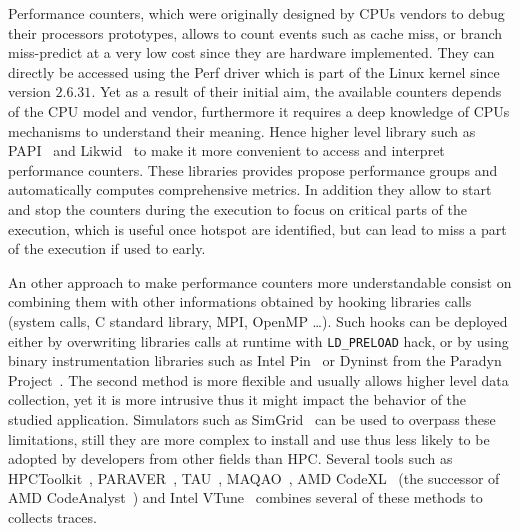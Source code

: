 Performance counters, which were originally designed by \glspl{CPU} vendors to
debug their processors prototypes, allows to count events such as cache miss,
or branch miss-predict at a very low cost since they are hardware implemented.
They can directly be accessed using the \gls{Perf} driver which is part of the
\gls{Linux} kernel since version $2.6.31$. Yet as a result of their initial
aim, the available counters depends of the \gls{CPU} model and vendor,
furthermore it requires a deep knowledge of \glspl{CPU} mechanisms to
understand their meaning. Hence higher level library such as
\gls{PAPI}~\cite{Browne00Portable,Malony11Parallel,Weaver13PAPI} and
\gls{Likwid}~\cite{Treibig10LIKWID} to make it more convenient to access and
interpret performance counters. These libraries provides propose performance
groups and automatically computes comprehensive metrics. In addition they
allow to start and stop the counters during the execution to focus on critical
parts of the execution, which is useful once hotspot are identified, but can
lead to miss a part of the execution if used to early.

An other approach to make performance counters more understandable consist on
combining them with other informations obtained by hooking libraries calls
(system calls, C standard library, \gls{MPI}, \gls{OpenMP} \ldots). Such hooks
can be deployed either by overwriting libraries calls at runtime with
\texttt{LD\_PRELOAD} hack, or by using binary instrumentation libraries such
as \gls{Intel} \gls{Pin}~\cite{Luk05Pin} or Dyninst from the Paradyn
Project~\cite{Miller95Paradyn}. The second method is more flexible and usually
allows higher level data collection, yet it is more intrusive thus it might
impact the behavior of the studied application. Simulators such as
\gls{SimGrid}~\cite{Casanova14Versatile} can be used to overpass these
limitations, still they are more complex to install and use thus less likely
to be adopted by developers from other fields than \gls{HPC}. Several tools
such as \gls{HPCToolkit}~\cite{Adhianto10HPCTOOLKIT},
\gls{PARAVER}~\cite{Pillet95PARAVER}, \gls{TAU}~\cite{Shende06Tau},
\gls{MAQAO}~\cite{Djoudi05MAQAO}, \gls{AMD}
\gls{CodeXL}~\cite{AMD16CodeXL} (the successor of \gls{AMD}
\gls{CodeAnalyst}~\cite{Drongowski08introduction}) and \gls{Intel}
\gls{VTune}~\cite{Reinders05VTune} combines several of these methods to
collects traces.

